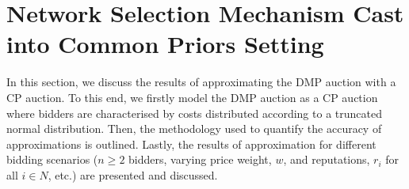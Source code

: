 

\section{Network Selection Mechanism Cast into Common Priors Setting} %
\label{sec:network_selection_mechanism_cast_into_common_priors_setting_approximation}
In this section, we discuss the results of approximating the DMP auction with a CP auction. To this end, we firstly model the DMP auction as a CP auction where bidders are characterised by costs distributed according to a truncated normal distribution. Then, the methodology used to quantify the accuracy of approximations is outlined. Lastly, the results of approximation for different bidding scenarios ($n\geq 2$ bidders, varying price weight, $w$, and reputations, $r_i$ for all $i\in N$, etc.) are presented and discussed.

